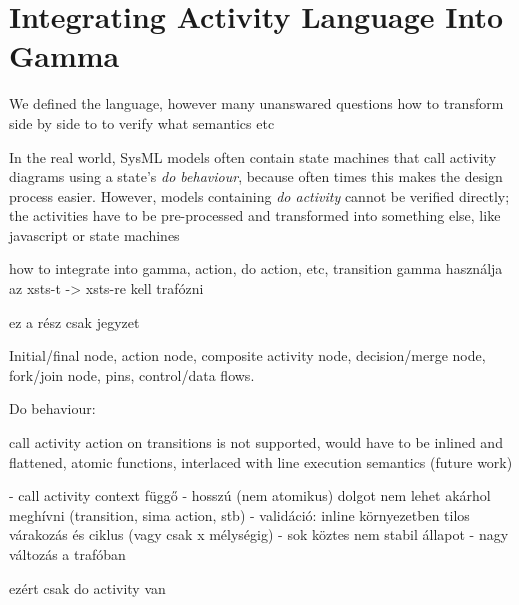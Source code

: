 \chapter{Integrating Activity Language Into Gamma}\label{ch:activiy_verification}

We defined the language, however many unanswared questions
how to transform side by side
to to verify
what semantics
etc

In the real world, SysML models often contain state machines that call activity diagrams using a state's \emph{do behaviour}, because often times this makes the design process easier. However, models containing \emph{do activity} cannot be verified directly; the activities have to be pre-processed and transformed into something else, like javascript or state machines \cite{10.1145/3417990.3421407}

how to integrate into gamma, action, do action, etc, transition
gamma használja az xsts-t -> xsts-re kell trafózni


ez a rész csak jegyzet

Initial/final node, action node, composite activity node, decision/merge node, fork/join node, pins, control/data flows.

Do behaviour: 

call activity action on transitions is not supported, would have to be inlined and flattened, atomic functions, interlaced with line execution semantics (future work)

- call activity context függő - hosszú (nem atomikus) dolgot nem lehet akárhol meghívni (transition, sima action, stb)
- validáció: inline környezetben tilos várakozás és ciklus (vagy csak x mélységig)
- sok köztes nem stabil állapot
- nagy változás a trafóban

ezért csak do activity van




